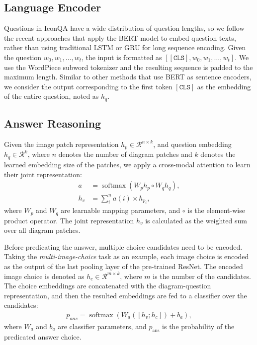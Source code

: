 \documentclass{article}
\begin{document}
\subsection{Language Encoder}
Questions in IconQA have a wide distribution of question lengths, so we follow the recent approaches \cite{vaswani2017attention,jiao2019tinybert,turc2019well,li2019visualbert, lu2019vilbert} that apply the BERT model \cite{devlin2018bert} to embed question texts, rather than using traditional LSTM \cite{hochreiter1997long} or GRU \cite{cho2014learning} for long sequence encoding. Given the question $w_0, w_1, \dots, w_t$, the input is formatted as $[\mathtt{[CLS]}, w_0, w_1, \dots, w_t]$. We use the WordPiece \cite{schuster2012japanese} subword tokenizer and the resulting sequence is padded to the maximum length. Similar to other methods that use BERT as sentence encoders, we consider the output corresponding to the first token $\mathtt{[CLS]}$ as the embedding of the entire question, noted as $h_q$.

\subsection{Answer Reasoning}
Given the image patch representation $h_p \in \mathcal{R}^{n \times k}$, and question embedding $h_q \in \mathcal{R}^{k}$, where $n$ denotes the number of diagram patches and $k$ denotes the learned embedding size of the patches, we apply a cross-modal attention to learn their joint representation:
\begin{align}
a &=\operatorname{softmax}\left(W_{p} h_p \circ W_{q} h_q\right) ,\\ 
h_v &=\sum_{i}^{n} a(i) \times h_{p_i} ,
\end{align}
where $W_{p}$ and $W_{q}$ are learnable mapping parameters, and $\circ$ is the element-wise product operator. The joint representation $h_v$ is calculated as the weighted sum over all diagram patches.

Before predicating the answer, multiple choice candidates need to be encoded. Taking the \textit{multi-image-choice} task as an example, each image choice is encoded as the output of the last pooling layer of the pre-trained ResNet. The encoded image choice is denoted as $h_c \in \mathcal{R}^{m\times k} $, where $m$ is the number of the candidates. The choice embeddings are concatenated with the diagram-question representation, and then the resulted embeddings are fed to a classifier over the candidates:
\begin{align}
p_{ans}=\operatorname{softmax}\left(W_{a}\left([h_{v};h_{c}]\right)+b_{a}\right), 
\end{align}
where $W_{a}$ and $b_{a}$ are classifier parameters, and $p_{\text {ans}}$ is the probability of the predicated answer choice. 
\end{document}
